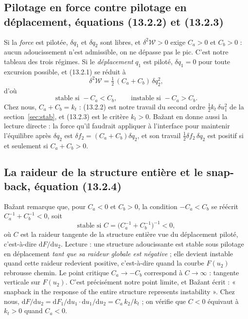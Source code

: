 \documentclass[11pt,a4paper]{article}
\newcommand{\dd}{\mathrm{d}}
\begin{document}
\subsection{Pilotage en force contre pilotage en déplacement, équations (13.2.2) et (13.2.3)}
Si la \emph{force} est pilotée, $\delta q_1$ et $\delta q_2$ sont libres, et $\delta^2\mathcal W > 0$
exige $C_a > 0$ et $C_b > 0$ : aucun adoucissement n'est admissible, on ne dépasse pas le pic.
C'est notre tableau des trois régimes. Si le \emph{déplacement} $q_1$ est piloté,
$\delta q_1 = 0$ pour toute excursion possible, et (13.2.1) se réduit à
\begin{equation}
  \delta^2\mathcal W = \tfrac12\,(C_a + C_b)\,\delta q_2^2 ,
  \tag{13.2.2}
\end{equation}
d'où
\begin{equation}
  \text{stable si } -C_a < C_b,\qquad \text{instable si } -C_a > C_b .
  \tag{13.2.3}
\end{equation}
Chez nous, $C_a + C_b = k_t$ : (13.2.2) est notre travail du second ordre
$\tfrac12k_t\,\delta u_1^2$ de la section~\ref{sec:stab}, et (13.2.3) est le critère
$k_t > 0$. Bažant en donne aussi la lecture directe : la force qu'il faudrait appliquer à
l'interface pour maintenir l'équilibre après $\delta q_2$ est $\delta f_2 = (C_a+C_b)\delta q_2$, et
son travail $\tfrac12\delta f_2\,\delta q_2$ est positif si et seulement si $C_a + C_b > 0$.

\subsection{La raideur de la structure entière et le snap-back, équation (13.2.4)}
Bažant remarque que, pour $C_a < 0$ et $C_b > 0$, la condition $-C_a < C_b$ se réécrit
$C_a^{-1} + C_b^{-1} < 0$, soit
\begin{equation}
  \text{stable si } C = \bigl(C_a^{-1}+C_b^{-1}\bigr)^{-1} < 0 ,
  \tag{13.2.4}
\end{equation}
où $C$ est la raideur tangente de la structure entière vue du déplacement piloté, c'est-à-dire
$\dd F/\dd u_2$. Lecture : une structure adoucissante est stable sous pilotage en déplacement
\emph{tant que sa raideur globale est négative} ; elle devient instable quand cette raideur
redevient positive, c'est-à-dire quand la courbe $F(u_2)$ rebrousse chemin. Le point critique
$C_a \to -C_b$ correspond à $C \to \infty$ : tangente verticale sur $F(u_2)$. C'est précisément
notre point limite, et Bažant écrit : « snapback in the response of the entire structure
represents instability ». Chez nous, $\dd F/\dd u_2 = \dd F_1/\dd u_1 \cdot \dd u_1/\dd u_2 =
C_a\,k_2/k_t$ ; on vérifie que $C < 0$ équivaut à $k_t > 0$ quand $C_a < 0$.
\end{document}
